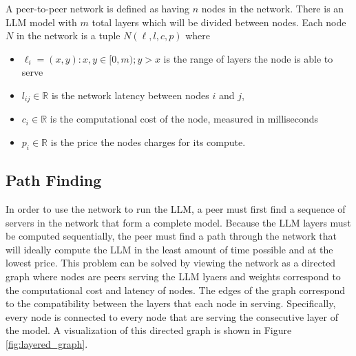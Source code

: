 \documentclass[preprint,twoside,11pt]{article}
\begin{document}
A peer-to-peer network is defined as having $n$ nodes in the network. There is an LLM model with $m$ total layers which will be divided between nodes.
Each node $N$ in the network is a tuple $N(\ell, l, c, p)$ where
\begin{itemize}
	\item $\ell _i = (x,y) : x,y \in [0,m); y > x$ is the range of layers the node is able to serve
	\item $l_{ij} \in \mathbb{R}$ is the network latency between nodes $i$ and $j$,
	\item $c_i \in \mathbb{R}$ is the computational cost of the node, measured in milliseconds
	\item $p_i \in \mathbb{R}$ is the price the nodes charges for its compute.
\end{itemize}

\subsection{Path Finding}

In order to use the network to run the LLM, a peer must first find a sequence of servers in the network that form a complete model.
Because the LLM layers must be computed sequentially, the peer must find a path through the network that will ideally compute
the LLM in the least amount of time possible and at the lowest price. This problem can be solved by viewing the network as a directed graph where nodes are peers serving the LLM lyaers and weights correspond
to the computational cost and latency of nodes. The edges of the graph correspond to the compatibility between the layers that each node in serving.
Specifically, every node is connected to every node that are serving the consecutive layer of the model. A visualization of this directed graph is shown in Figure \ref{fig:layered_graph}.
\end{document}

